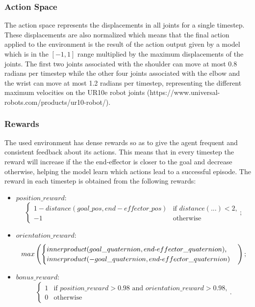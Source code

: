 \subsubsection{Action Space}

The action space represents the displacements in all joints for a single timestep. These displacements are also normalized which means that the final action applied to the environment is the result of the action output given by a model which is in the $[-1, 1]$ range multiplied by the maximum displacements of the joints. The first two joints associated with the shoulder can move at most 0.8 radians per timestep while the other four joints associated with the elbow and the wrist can move at most 1.2 radians per timestep, representing the different maximum velocities on the UR10e robot joints (https://www.universal-robots.com/products/ur10-robot/).

\subsubsection{Rewards}

The used environment has dense rewards so as to give the agent frequent and consistent feedback about its actions. This means that in every timestep the reward will increase if the the end-effector is closer to the goal and decrease otherwise, helping the model learn which actions lead to a successful episode. The reward in each timestep is obtained from the following rewards:

\begin{itemize}
    \item $position\_reward$: \[
            \begin{cases}
                1-distance(goal\_pos, end-effector\_pos) & \text{if $distance(...)<2$,}\\
                -1 & \text{otherwise}
            \end{cases};
        \]

    \item $orientation\_reward$: \[
            max\left(
            \begin{cases}
                innerproduct(goal\_quaternion, end$-$effector\_quaternion) \text{,}\\
                innerproduct(-goal\_quaternion, end$-$effector\_quaternion)
            \end{cases}\right)\text{;}
        \]
    \item $bonus\_reward$: \[
            \begin{cases}
                1 & \text{if $position\_reward>0.98$ and $orientation\_reward>0.98$,}\\
                0 & \text{otherwise}
            \end{cases}\text{.}
        \]

\end{itemize}

